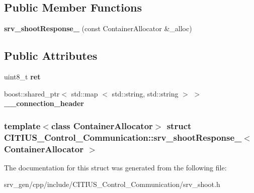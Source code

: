\subsection*{\-Public \-Member \-Functions}
\begin{DoxyCompactItemize}
\item 
\hypertarget{struct_c_i_t_i_u_s___control___communication_1_1srv__shoot_response___a3d10a5b139da7b27fcc6880f8e4bdb59}{{\bfseries srv\-\_\-shoot\-Response\-\_\-} (const \-Container\-Allocator \&\-\_\-alloc)}\label{struct_c_i_t_i_u_s___control___communication_1_1srv__shoot_response___a3d10a5b139da7b27fcc6880f8e4bdb59}

\end{DoxyCompactItemize}
\subsection*{\-Public \-Attributes}
\begin{DoxyCompactItemize}
\item 
\hypertarget{struct_c_i_t_i_u_s___control___communication_1_1srv__shoot_response___a9879257dfa65657de81964973b15760b}{uint8\-\_\-t {\bfseries ret}}\label{struct_c_i_t_i_u_s___control___communication_1_1srv__shoot_response___a9879257dfa65657de81964973b15760b}

\item 
\hypertarget{struct_c_i_t_i_u_s___control___communication_1_1srv__shoot_response___a160b8129d269e54ee95e52995bf113bc}{boost\-::shared\-\_\-ptr$<$ std\-::map\*
$<$ std\-::string, std\-::string $>$ $>$ {\bfseries \-\_\-\-\_\-connection\-\_\-header}}\label{struct_c_i_t_i_u_s___control___communication_1_1srv__shoot_response___a160b8129d269e54ee95e52995bf113bc}

\end{DoxyCompactItemize}
\subsubsection*{template$<$class Container\-Allocator$>$ struct C\-I\-T\-I\-U\-S\-\_\-\-Control\-\_\-\-Communication\-::srv\-\_\-shoot\-Response\-\_\-$<$ Container\-Allocator $>$}



\-The documentation for this struct was generated from the following file\-:\begin{DoxyCompactItemize}
\item 
srv\-\_\-gen/cpp/include/\-C\-I\-T\-I\-U\-S\-\_\-\-Control\-\_\-\-Communication/srv\-\_\-shoot.\-h\end{DoxyCompactItemize}
